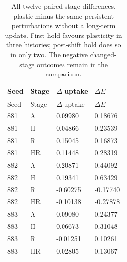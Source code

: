 \begin{longtable}{llll}
\caption{All twelve paired stage differences, plastic minus the same persistent perturbations without a long-term update. First hold favours plasticity in three histories; post-shift hold does so in only two. The negative changed-stage outcomes remain in the comparison.}\label{tab:contact-pairs}\\
\toprule
Seed & Stage & $\Delta$ uptake & $\Delta E$\\
\midrule\endfirsthead
\toprule
Seed & Stage & $\Delta$ uptake & $\Delta E$\\
\midrule\endhead
881 & A & 0.09980 & 0.18676\\
881 & H & 0.04866 & 0.23539\\
881 & R & 0.15045 & 0.16873\\
881 & HR & 0.11448 & 0.28319\\
882 & A & 0.20871 & 0.44092\\
882 & H & 0.19341 & 0.63429\\
882 & R & -0.60275 & -0.17740\\
882 & HR & -0.10138 & -0.27878\\
883 & A & 0.09080 & 0.24377\\
883 & H & 0.06673 & 0.31048\\
883 & R & -0.01251 & 0.10261\\
883 & HR & 0.02805 & 0.13067\\
\bottomrule
\end{longtable}

